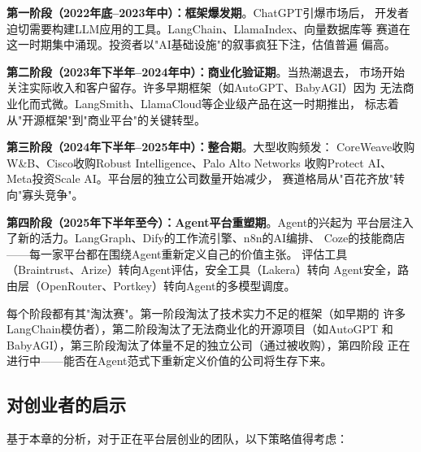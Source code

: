 \textbf{第一阶段（2022年底--2023年中）：框架爆发期}。ChatGPT引爆市场后，
开发者迫切需要构建LLM应用的工具。LangChain、LlamaIndex、向量数据库等
赛道在这一时期集中涌现。投资者以"AI基础设施"的叙事疯狂下注，估值普遍
偏高。

\textbf{第二阶段（2023年下半年--2024年中）：商业化验证期}。当热潮退去，
市场开始关注实际收入和客户留存。许多早期框架（如AutoGPT、BabyAGI）因为
无法商业化而式微。LangSmith、LlamaCloud等企业级产品在这一时期推出，
标志着从"开源框架"到"商业平台"的关键转型。

\textbf{第三阶段（2024年下半年--2025年中）：整合期}。大型收购频发：
CoreWeave收购W\&B、Cisco收购Robust Intelligence、Palo Alto Networks
收购Protect AI、Meta投资Scale AI。平台层的独立公司数量开始减少，
赛道格局从"百花齐放"转向"寡头竞争"。

\textbf{第四阶段（2025年下半年至今）：Agent平台重塑期}。Agent的兴起为
平台层注入了新的活力。LangGraph、Dify的工作流引擎、n8n的AI编排、
Coze的技能商店——每一家平台都在围绕Agent重新定义自己的价值主张。
评估工具（Braintrust、Arize）转向Agent评估，安全工具（Lakera）转向
Agent安全，路由层（OpenRouter、Portkey）转向Agent的多模型调度。

每个阶段都有其"淘汰赛"。第一阶段淘汰了技术实力不足的框架（如早期的
许多LangChain模仿者），第二阶段淘汰了无法商业化的开源项目（如AutoGPT
和BabyAGI），第三阶段淘汰了体量不足的独立公司（通过被收购），第四阶段
正在进行中——能否在Agent范式下重新定义价值的公司将生存下来。

\subsection{对创业者的启示}

基于本章的分析，对于正在平台层创业的团队，以下策略值得考虑：

